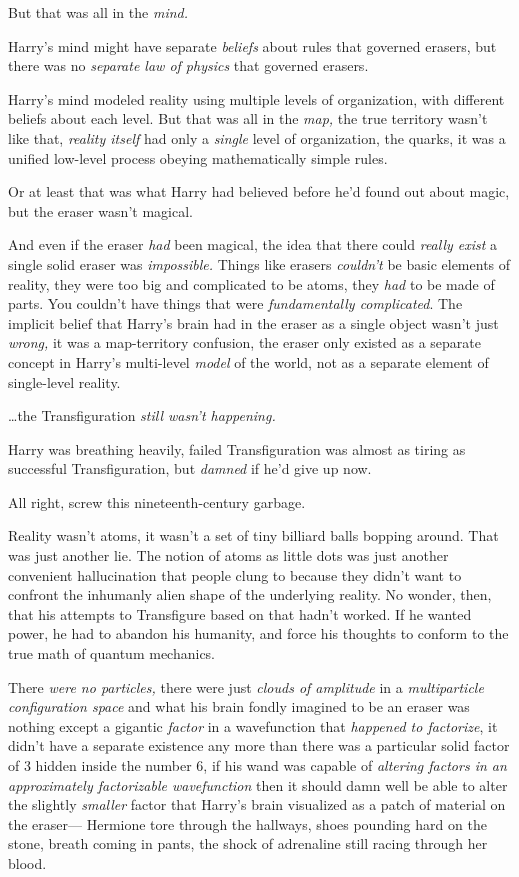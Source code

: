 But that was all in the \emph{mind.}

Harry's mind might have separate \emph{beliefs} about rules that governed
erasers, but there was no \emph{separate law of physics} that governed erasers.

Harry's mind modeled reality using multiple levels of organization, with
different beliefs about each level. But that was all in the \emph{map,} the
true territory wasn't like that, \emph{reality itself} had only a \emph{single}
level of organization, the quarks, it was a unified low-level process obeying
mathematically simple rules.

Or at least that was what Harry had believed before he'd found out about magic,
but the eraser wasn't magical.

And even if the eraser \emph{had} been magical, the idea that there could
\emph{really exist} a single solid eraser was \emph{impossible.} Things like
erasers \emph{couldn't} be basic elements of reality, they were too big and
complicated to be atoms, they \emph{had} to be made of parts. You
couldn't have things that were \emph{fundamentally complicated}. The implicit
belief that Harry's brain had in the eraser as a single object wasn't just
\emph{wrong,} it was a map-territory confusion, the eraser only existed as a
separate concept in Harry's multi-level \emph{model} of the world, not as a
separate element of single-level reality.

{\ldots}the Transfiguration \emph{still wasn't happening.}

Harry was breathing heavily, failed Transfiguration was almost as tiring as
successful Transfiguration, but \emph{damned} if he'd give up now.

All right, screw this nineteenth-century garbage.

Reality wasn't atoms, it wasn't a set of tiny billiard balls bopping around.
That was just another lie. The notion of atoms as little dots was just another
convenient hallucination that people clung to because they didn't want to
confront the inhumanly alien shape of the underlying reality. No wonder, then,
that his attempts to Transfigure based on that hadn't worked. If he wanted
power, he had to abandon his humanity, and force his thoughts to conform to the
true math of quantum mechanics.

There \emph{were no particles,} there were just \emph{clouds of amplitude} in a
\emph{multiparticle configuration space} and what his brain fondly imagined to
be an eraser was nothing except a gigantic \emph{factor} in a wavefunction that
\emph{happened to factorize}, it didn't have a separate existence any more than
there was a particular solid factor of 3 hidden inside the number 6, if his
wand was capable of \emph{altering factors in an approximately factorizable
wavefunction} then it should damn well be able to alter the slightly
\emph{smaller} factor that Harry's brain visualized as a patch of material on
the eraser---
\later
Hermione tore through the hallways, shoes pounding hard on the stone, breath
coming in pants, the shock of adrenaline still racing through her blood.


